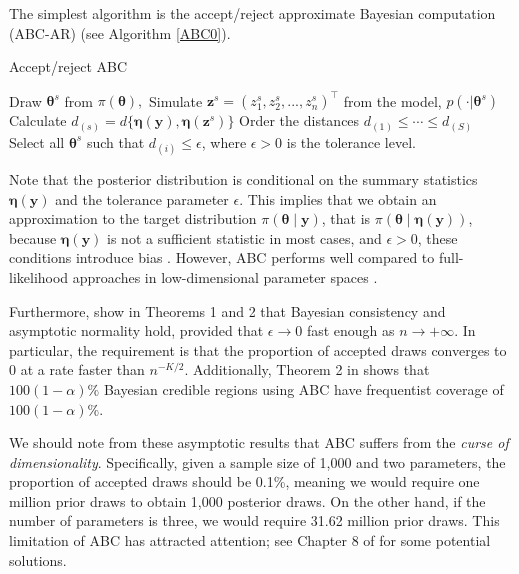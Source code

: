 The simplest algorithm is the accept/reject approximate Bayesian computation (ABC-AR) (see Algorithm \ref{ABC0}).

\begin{algorithm}
	\caption{Accept/reject ABC}\label{ABC0}
	\begin{algorithmic}[1]
		\State Draw ${\boldsymbol {\theta} }^{s}$ from $\pi({ \boldsymbol{\theta} }),$
		\State Simulate ${\boldsymbol z}^{s}=(z_{1}^{s},z_{2}^{s},...,z_{n}^{s})^{\top}$ from the model, $p(\cdot|{\boldsymbol{\theta} }^{s})$
		\State Calculate
		$d_{(s)}=d\{{\boldsymbol\eta }({\boldsymbol y}),{\boldsymbol \eta }({\boldsymbol z}^{s})\}$
		\EndFor
		\State Order the distances $d_{(1)}\leq\cdots\leq d_{(S)}$
		\State Select all $\boldsymbol{\theta}^s$ such that $d_{(i)}\leq \epsilon$, where $\epsilon>0$ is the tolerance level. 
	\end{algorithmic}
\end{algorithm}

Note that the posterior distribution is conditional on the summary statistics \( \boldsymbol{\eta}(\boldsymbol{y}) \) and the tolerance parameter \( \epsilon \). This implies that we obtain an approximation to the target distribution \( \pi(\boldsymbol{\theta} \mid \boldsymbol{y}) \), that is \( \pi(\boldsymbol{\theta} \mid \boldsymbol{\eta}(\boldsymbol{y})) \), because \( \boldsymbol{\eta}(\boldsymbol{y}) \) is not a sufficient statistic in most cases, and \( \epsilon > 0 \), these conditions introduce bias \cite{blum2010approximate}. However, ABC performs well compared to full-likelihood approaches in low-dimensional parameter spaces \cite{beaumont2002approximate}.

Furthermore, \cite{frazier2018asymptotic} show in Theorems 1 and 2 that Bayesian consistency and asymptotic normality hold, provided that \( \epsilon \to 0 \) fast enough as \( n \to +\infty \). In particular, the requirement is that the proportion of accepted draws converges to 0 at a rate faster than \( n^{-K / 2} \). Additionally, Theorem 2 in \cite{frazier2018asymptotic} shows that \( 100(1 -\alpha)\% \) Bayesian credible regions using ABC have frequentist coverage of \( 100(1 -\alpha)\% \). 

We should note from these asymptotic results that ABC suffers from the \textit{curse of dimensionality}. Specifically, given a sample size of 1,000 and two parameters, the proportion of accepted draws should be 0.1\%, meaning we would require one million prior draws to obtain 1,000 posterior draws. On the other hand, if the number of parameters is three, we would require 31.62 million prior draws. This limitation of ABC has attracted attention; see Chapter 8 of \cite{sisson2018handbook} for some potential solutions.

